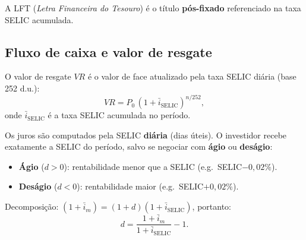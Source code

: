 A LFT (\textit{Letra Financeira do Tesouro}) é o título \textbf{pós-fixado} referenciado
na taxa SELIC acumulada.

\subsection{Fluxo de caixa e valor de resgate}

\begin{center}
\end{center}

O valor de resgate $VR$ é o valor de face atualizado pela taxa SELIC diária (base 252 d.u.):
\[
  VR = P_0\,(1 + \bar{i}_{\text{SELIC}})^{n/252},
\]
onde $\bar{i}_{\text{SELIC}}$ é a taxa SELIC acumulada no período.

\begin{nota}
Os juros são computados pela SELIC \textbf{diária} (dias úteis). O investidor recebe exatamente
a SELIC do período, salvo se negociar com \textbf{ágio} ou \textbf{deságio}:
\begin{itemize}[leftmargin=1.8em, nosep]
  \item \textbf{Ágio} ($d > 0$): rentabilidade menor que a SELIC (e.g.\ SELIC$-0{,}02\%$).
  \item \textbf{Deságio} ($d < 0$): rentabilidade maior (e.g.\ SELIC$+0{,}02\%$).
\end{itemize}
Decomposição: $(1+\bar{i}_m) = (1+d)(1+\bar{i}_{\text{SELIC}})$, portanto:
\[
  d = \frac{1+\bar{i}_m}{1+\bar{i}_{\text{SELIC}}} - 1.
\]
\end{nota}

